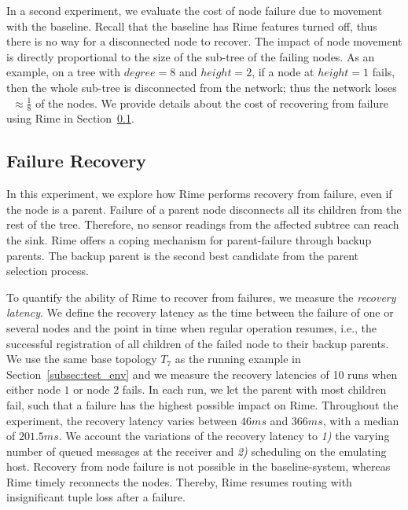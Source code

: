 In a second experiment, we evaluate the cost of node failure due to movement with the baseline. Recall that the baseline has Rime features turned off, thus there is no way for a disconnected node to recover. 
The impact of node movement is directly proportional to the size of the sub-tree of the failing nodes. %
As an example, on a tree with $degree=8$ and $height=2$, if a node at $height=1$ 
fails, then the whole sub-tree is disconnected from the network; thus the network loses ~$\approx\frac{1}{8}$ of the nodes. We provide details about the cost of recovering from failure using Rime in Section~\ref{sec:evaluation-failure-recovery}.

\subsection{Failure Recovery}\label{sec:evaluation-failure-recovery}
In this experiment, we explore how Rime performs recovery from failure, even if the node is a parent.
Failure of a parent node disconnects all its children from the rest of the tree.
Therefore, no sensor readings from the affected subtree can reach the sink. Rime offers a coping mechanism for parent-failure through backup parents. The backup parent is the second best candidate from the parent selection process.

To quantify the ability of Rime to recover from failures, we measure the \textit{recovery latency}.
We define the recovery latency as the time between the failure of one or several nodes and the point in time when regular operation resumes, i.e., the successful registration of all children of the failed node to their backup parents.
We use the same base topology $T_7$ as the running example in Section~\ref{subsec:test_env} and
we measure the recovery latencies of 10 runs when either node $1$ or node $2$ fails.
In each run, we let the parent with most children fail, such that a failure has the highest possible impact on Rime. Throughout the experiment, the recovery latency varies between $46ms$ and $366ms$, with a median of $201.5ms$. We account the variations of the recovery latency to \textit{1)} the varying number of queued messages at the receiver and \textit{2)} scheduling on the emulating host. 
% 
Recovery from node failure is not possible in the baseline-system, whereas Rime timely reconnects the nodes. Thereby, Rime resumes routing with insignificant tuple loss after a failure.

